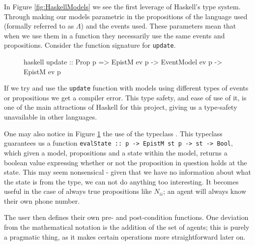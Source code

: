 \documentclass[ %
                    author={Leo Poulson},
                supervisor={Dr. Steven Ramsay},
                    degree={BSc},
                     title={Epistemic Planning for the Dynamic Gossip problem},
                  subtitle={},
                      year={2019} ]{dissertation}
\begin{document}
In Figure \ref{fig:HaskellModels} we see the first leverage of Haskell's type
system. Through making our models parametric in the propositions of the language
used (formally referred to as $\Lambda$) and the events used. These parameters
mean that when we use them in a function they necessarily use the same events
and propositions. Consider the function signature for \texttt{update}.

\begin{figure}[h]
  \centering
  \begin{cminted}{haskell}
    update :: Prop p => EpistM ev p -> EventModel ev p -> EpistM ev p
\end{cminted}
  \caption{}
  \label{fig:UpdateType}
\end{figure}

If we try and use the \texttt{update} function with models using
different types of events or propositions we get a compiler error. This type
safety, and ease of use of it, is one of the main attractions of Haskell for
this project, giving us a type-safety unavailable in other languages. 

One may also notice in Figure \ref{fig:UpdateType} the use of the typeclass
. This typeclass guarantees us a function
\texttt{evalState :: p -> EpistM st p -> st -> Bool}, which given a
model, propositions and a state within the model, returns a boolean value
expressing whether or not the proposition in question holds at the state. This
may seem nonsensical - given that we have no information about what the state is
from the type, we can not do anything too interesting. It becomes useful in the
case of always true propositions like $N_{ii}$; an agent will always know
their own phone number.

The user then defines their own \textsf{pre}- and \textsf{post}-condition
functions. One deviation from the mathematical notation is the addition of the
set of agents; this is purely a pragmatic thing, as it makes certain operations
more straightforward later on.
\end{document}
